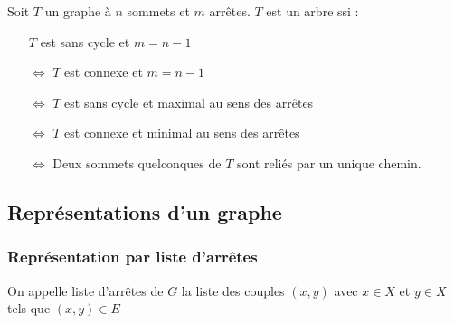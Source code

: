 \begin{theorem}
    Soit $T$ un graphe à $n$ sommets et $m$ arrêtes. $T$ est un arbre ssi :
    \begin{itemize}
        \item[\empty] $T$ est sans cycle et $m = n-1$ 
        \item[$\Longleftrightarrow$] $T$ est connexe et $m = n-1$
        \item[$\Longleftrightarrow$] $T$ est sans cycle et maximal au sens des arrêtes
        \item[$\Longleftrightarrow$] $T$ est connexe et minimal au sens des arrêtes 
        \item[$\Longleftrightarrow$] Deux sommets quelconques de $T$ sont reliés par un unique chemin.  
    \end{itemize}
\end{theorem}


\subsection{Représentations d'un graphe}

\subsubsection{Représentation par liste d'arrêtes}

\begin{definition}
    On appelle liste d'arrêtes de $G$ la liste des couples $(x,y)$ avec $x \in X$ et $y \in X$ tels que $(x,y) \in E$
\end{definition}


